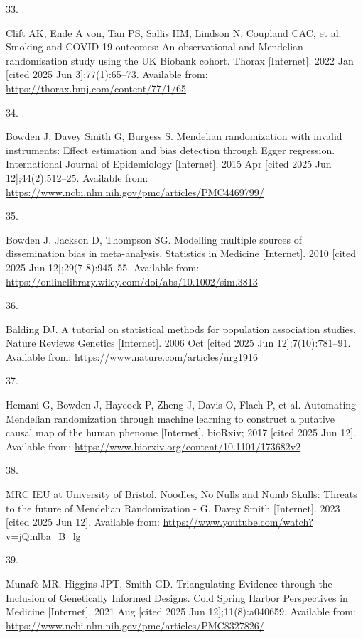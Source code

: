 \documentclass[
]{article}
\newlength{\cslhangindent}
\newlength{\csllabelwidth}
\newenvironment{CSLReferences}[2] %
 {\begin{list}{}{%
  \setlength{\itemindent}{0pt}
  \setlength{\leftmargin}{0pt}
  \setlength{\parsep}{0pt}
  \ifodd #1
   \setlength{\leftmargin}{\cslhangindent}
   \setlength{\itemindent}{-1\cslhangindent}
  \fi
  \setlength{\itemsep}{#2\baselineskip}}}
 {\end{list}}
\newcommand{\CSLLeftMargin}[1]{\parbox[t]{\csllabelwidth}{\strut#1\strut}}
\newcommand{\CSLRightInline}[1]{\parbox[t]{\linewidth - \csllabelwidth}{\strut#1\strut}}
\begin{document}
\begin{CSLReferences}{0}{1}
\CSLLeftMargin{33. }%
\CSLRightInline{Clift AK, Ende A von, Tan PS, Sallis HM, Lindson N, Coupland CAC, et al. Smoking and {COVID}-19 outcomes: An observational and {Mendelian} randomisation study using the {UK} {Biobank} cohort. Thorax {[}Internet{]}. 2022 Jan {[}cited 2025 Jun 3{]};77(1):65--73. Available from: \url{https://thorax.bmj.com/content/77/1/65}}

\CSLLeftMargin{34. }%
\CSLRightInline{Bowden J, Davey Smith G, Burgess S. Mendelian randomization with invalid instruments: Effect estimation and bias detection through {Egger} regression. International Journal of Epidemiology {[}Internet{]}. 2015 Apr {[}cited 2025 Jun 12{]};44(2):512--25. Available from: \url{https://www.ncbi.nlm.nih.gov/pmc/articles/PMC4469799/}}

\CSLLeftMargin{35. }%
\CSLRightInline{Bowden J, Jackson D, Thompson SG. Modelling multiple sources of dissemination bias in meta-analysis. Statistics in Medicine {[}Internet{]}. 2010 {[}cited 2025 Jun 12{]};29(7-8):945--55. Available from: \url{https://onlinelibrary.wiley.com/doi/abs/10.1002/sim.3813}}

\CSLLeftMargin{36. }%
\CSLRightInline{Balding DJ. A tutorial on statistical methods for population association studies. Nature Reviews Genetics {[}Internet{]}. 2006 Oct {[}cited 2025 Jun 12{]};7(10):781--91. Available from: \url{https://www.nature.com/articles/nrg1916}}

\CSLLeftMargin{37. }%
\CSLRightInline{Hemani G, Bowden J, Haycock P, Zheng J, Davis O, Flach P, et al. Automating {Mendelian} randomization through machine learning to construct a putative causal map of the human phenome {[}Internet{]}. bioRxiv; 2017 {[}cited 2025 Jun 12{]}. Available from: \url{https://www.biorxiv.org/content/10.1101/173682v2}}

\CSLLeftMargin{38. }%
\CSLRightInline{MRC IEU at University of Bristol. Noodles, {No} {Nulls} and {Numb} {Skulls}: {Threats} to the future of {Mendelian} {Randomization} - {G}. {Davey} {Smith} {[}Internet{]}. 2023 {[}cited 2025 Jun 12{]}. Available from: \url{https://www.youtube.com/watch?v=jQmlba_B_lg}}

\CSLLeftMargin{39. }%
\CSLRightInline{Munafò MR, Higgins JPT, Smith GD. Triangulating {Evidence} through the {Inclusion} of {Genetically} {Informed} {Designs}. Cold Spring Harbor Perspectives in Medicine {[}Internet{]}. 2021 Aug {[}cited 2025 Jun 12{]};11(8):a040659. Available from: \url{https://www.ncbi.nlm.nih.gov/pmc/articles/PMC8327826/}}


\end{CSLReferences}
\end{document}
